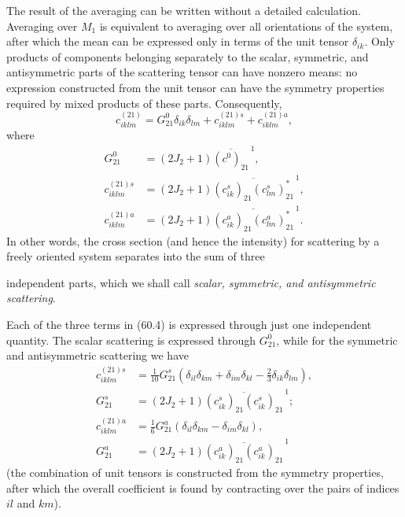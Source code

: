 The result of the averaging can be written without a detailed calculation. Averaging over $M_1$ is equivalent to averaging over all orientations of the system, after which the mean can be expressed only in terms of the unit tensor $\delta_{ik}$. Only products of components belonging separately to the scalar, symmetric, and antisymmetric parts of the scattering tensor can have nonzero means: no expression constructed from the unit tensor can have the symmetry properties required by mixed products of these parts. Consequently,
\begin{equation}
c_{iklm}^{(21)}=G_{21}^0\delta_{ik}\delta_{lm}+c_{iklm}^{(21)s}+c_{iklm}^{(21)a},
\tag{60.4}
\end{equation}
where
\begin{equation}
\begin{aligned}
G_{21}^0&=(2J_2+1)\overline{(c^0)_{21}}^{\,1},\\
c_{iklm}^{(21)s}&=(2J_2+1)\overline{(c_{ik}^s)_{21}(c_{lm}^s)_{21}^*}^{\,1},\\
c_{iklm}^{(21)a}&=(2J_2+1)\overline{(c_{ik}^a)_{21}(c_{lm}^a)_{21}^*}^{\,1}.
\end{aligned}
\tag{60.5}
\end{equation}
In other words, the cross section (and hence the intensity) for scattering by a freely oriented system separates into the sum of three

independent parts, which we shall call \emph{scalar, symmetric, and antisymmetric scattering}.

Each of the three terms in (60.4) is expressed through just one independent quantity. The scalar scattering is expressed through $G_{21}^0$, while for the symmetric and antisymmetric scattering we have
\begin{equation}
\begin{aligned}
c_{iklm}^{(21)s}&=\frac1{10}G_{21}^s
\left(\delta_{il}\delta_{km}+\delta_{im}\delta_{kl}-\frac23\delta_{ik}\delta_{lm}\right),\\
G_{21}^s&=(2J_2+1)\overline{(c_{ik}^s)_{21}(c_{ik}^s)_{21}}^{\,1};\\
c_{iklm}^{(21)a}&=\frac16G_{21}^a(\delta_{il}\delta_{km}-\delta_{im}\delta_{kl}),\\
G_{21}^a&=(2J_2+1)\overline{(c_{ik}^a)_{21}(c_{ik}^a)_{21}}^{\,1}
\end{aligned}
\tag{60.6}
\end{equation}
(the combination of unit tensors is constructed from the symmetry properties, after which the overall coefficient is found by contracting over the pairs of indices $il$ and $km$).

